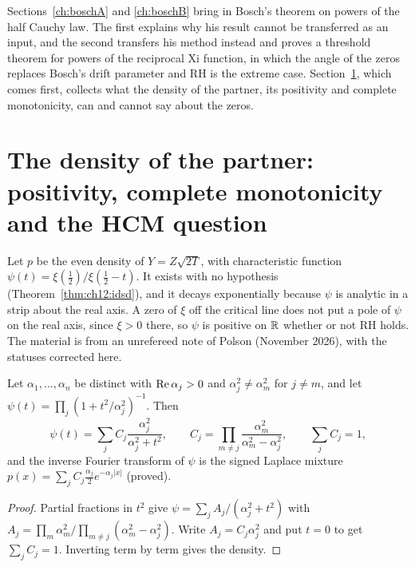 \label{chap:hcm}

Sections~\ref{ch:boschA} and \ref{ch:boschB} bring in Bosch's theorem on powers of the half Cauchy law. The first explains why his result cannot be transferred as an input, and the second transfers his method instead and proves a threshold theorem for powers of the reciprocal Xi function, in which the angle of the zeros replaces Bosch's drift parameter and RH is the extreme case. Section~\ref{xi:sec:cmq}, which comes first, collects what the density of the partner, its positivity and complete monotonicity, can and cannot say about the zeros.

\section{The density of the partner: positivity, complete monotonicity and the HCM question}\label{xi:sec:cmq}\label{xi:sec:density}

Let $p$ be the even density of $Y=Z\sqrt{2T}$, with characteristic function $\psi(t)=\xi(\frac12)/\xi(\frac12-t)$. It exists with no hypothesis (Theorem~\ref{thm:ch12:idsd}), and it decays exponentially because $\psi$ is analytic in a strip about the real axis. A zero of $\xi$ off the critical line does not put a pole of $\psi$ on the real axis, since $\xi>0$ there, so $\psi$ is positive on $\mathbb{R}$ whether or not RH holds. The material is from an unrefereed note of Polson (November 2026), with the statuses corrected here.

\begin{proposition}\label{xi:prop:mixture}
Let $\alpha_1,\dots,\alpha_n$ be distinct with $\operatorname{Re}\alpha_j>0$ and $\alpha_j^2\ne\alpha_m^2$ for $j\ne m$, and let $\psi(t)=\prod_j(1+t^2/\alpha_j^2)^{-1}$. Then
\begin{equation}\label{xi:eq:mixture}
\psi(t)=\sum_jC_j\frac{\alpha_j^2}{\alpha_j^2+t^2},\qquad C_j=\prod_{m\ne j}\frac{\alpha_m^2}{\alpha_m^2-\alpha_j^2},\qquad\sum_jC_j=1,
\end{equation}
and the inverse Fourier transform of $\psi$ is the signed Laplace mixture $p(x)=\sum_jC_j\frac{\alpha_j}2e^{-\alpha_j|x|}$ (proved).
\end{proposition}

\begin{proof}
Partial fractions in $t^2$ give $\psi=\sum_jA_j/(\alpha_j^2+t^2)$ with $A_j=\prod_m\alpha_m^2\big/\prod_{m\ne j}(\alpha_m^2-\alpha_j^2)$. Write $A_j=C_j\alpha_j^2$ and put $t=0$ to get $\sum_jC_j=1$. Inverting term by term gives the density.
\end{proof}

